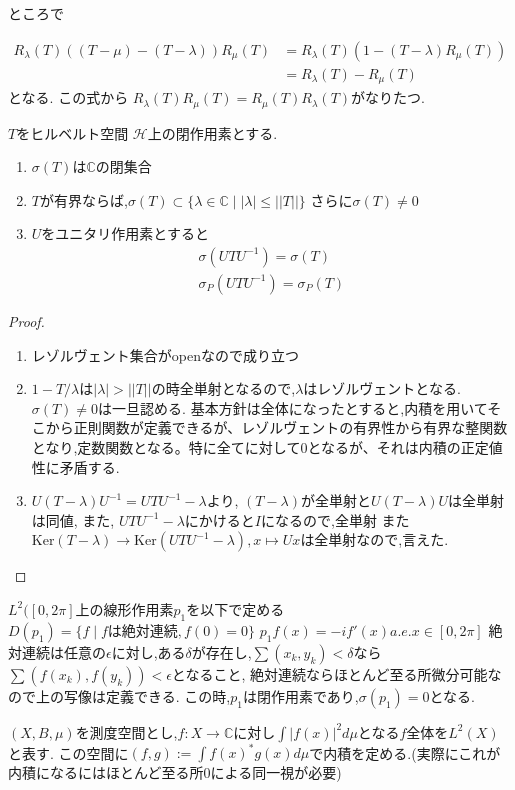 \documentclass[uplatex]{jsbook}
\begin{document}
ところで

\begin{align*}
R_{\lambda}(T) ((T -\mu) - (T - \lambda))R_{\mu}(T) & = R_{\lambda}(T)(1 - (T-\lambda)R_{\mu}(T)) \\
                                                    & = R_{\lambda}(T) - R_{\mu}(T)
\end{align*}
となる.
この式から
$R_{\lambda}(T)R_{\mu}(T) = R_{\mu}(T)R_{\lambda}(T)$がなりたつ.

\begin{thm}
 $T$をヒルベルト空間 $\mathcal{H}$上の閉作用素とする.
 \begin{enumerate}
   \item $\sigma(T)$は$\mathbb{C}$の閉集合
   \item $T$が有界ならば,$\sigma(T) \subset \{\lambda \in \mathbb{C} \mid |\lambda| \le ||T||\}$
   さらに$\sigma(T) \neq 0$
   \item $U$をユニタリ作用素とすると
   \begin{align*}
    \sigma(UTU^{-1}) = \sigma(T) \\
    \sigma_P(UTU^{-1}) = \sigma_P(T)
  \end{align*}
 \end{enumerate}
\end{thm}

\begin{proof}
\begin{enumerate}
  \item レゾルヴェント集合がopenなので成り立つ
  \item $1 - T/ \lambda$は$|\lambda| > ||T||$の時全単射となるので,$\lambda$はレゾルヴェントとなる.
   $\sigma(T) \neq 0$は一旦認める. 基本方針は全体になったとすると,内積を用いてそこから正則関数が定義できるが、レゾルヴェントの有界性から有界な整関数となり,定数関数となる。特に全てに対して0となるが、それは内積の正定値性に矛盾する.
  \item $U(T - \lambda)U^{-1} = UTU^{-1} - \lambda$より,
  $(T-\lambda)$が全単射と$U(T - \lambda)U$は全単射は同値,
  また,
  $UTU^{-1} - \lambda$にかけると$I$になるので,全単射
  また$\mathrm{Ker}(T-\lambda) \to \mathrm{Ker}(UTU^{-1} - \lambda), x \mapsto Ux$は全単射なので,言えた.
\end{enumerate}
\end{proof}

\begin{epl}
  $L^2([0, 2\pi]$上の線形作用素$p_1$を以下で定める
  $D(p_1) = \{f \mid f \mbox{は絶対連続}, f(0)=0\}$
  $p_1f(x) = - i f'(x) a.e . x \in [0, 2\pi]$
  絶対連続は任意の$\epsilon$に対し,ある$\delta$が存在し,$\sum (x_k,y_k) < \delta$なら$\sum (f(x_k), f(y_k))<\epsilon$となること,
  絶対連続ならほとんど至る所微分可能なので上の写像は定義できる.
  この時,$p_1$は閉作用素であり,$\sigma(p_1)=0$となる.
\end{epl}
$(X, B, \mu)$を測度空間とし,$f:X \to \mathbb{C}$に対し$\int |f(x)|^2 d\mu$となる$f$全体を$L^2(X)$と表す.
この空間に$(f, g):= \int f(x)^*g(x) d\mu$で内積を定める.(実際にこれが内積になるにはほとんど至る所0による同一視が必要)
\end{document}
